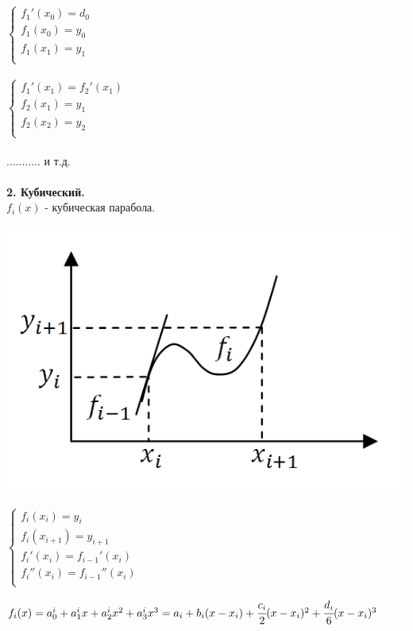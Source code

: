 \documentclass[12pt]{article}
\theoremstyle{definition}
\numberwithin{equation}{section}
\begin{document}
$  
\left\{  
\begin{array}{lcl}  
    f_1'(x_0) = d_0 \\  
    f_1(x_0) = y_0\\
    f_1(x_1) = y_1\\
\end{array}   
\right.  
$
\\ \\
$  
\left\{  
\begin{array}{lcl}  
    f_1'(x_1) = f_2'(x_1) \\  
    f_2(x_1) = y_1\\
    f_2(x_2) = y_2\\
\end{array}   
\right.  
$\\ \\
........... и т.д.\\
\\
\noindent \textbf{2. Кубический.}\\
$f_i(x)$ - кубическая парабола.\begin{center}
\includegraphics[scale=0.6]{l3_5.png}\end{center}
$  
\left\{  
\begin{array}{lcl}  
    f_i(x_i) = y_i \\  
    f_i(x_{i+1}) = y_{i+1}\\
    f_i'(x_i) = f_{i-1}'(x_i)\\
    f_i''(x_i) = f_{i-1}''(x_i)\\
\end{array}   
\right.  
$
\begin{center}
$f_i(x) = a_0^i+a_1^ix+a_2^ix^2+a_3^ix^3 = a_i+b_i(x-x_i)+ \cfrac{c_i}{2}(x-x_i)^2+ \cfrac{d_i}{6}(x-x_i)^3$
\end{center}
\end{document}

